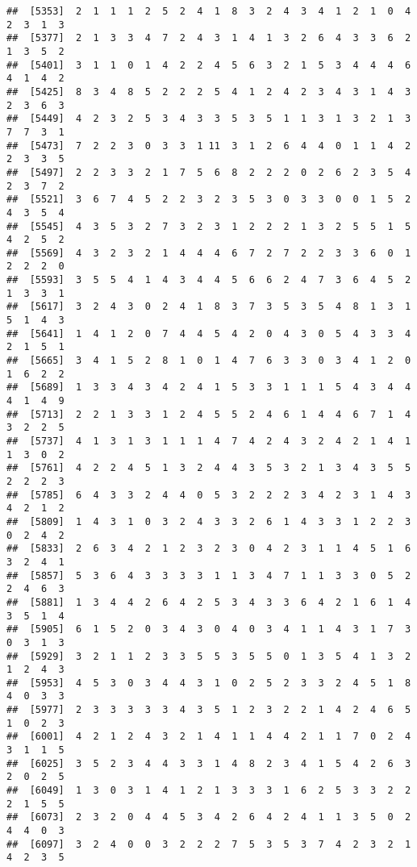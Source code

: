 \documentclass[
]{article}
\begin{document}
\begin{verbatim}
##  [5353]  2  1  1  1  2  5  2  4  1  8  3  2  4  3  4  1  2  1  0  4  2  3  1  3
##  [5377]  2  1  3  3  4  7  2  4  3  1  4  1  3  2  6  4  3  3  6  2  1  3  5  2
##  [5401]  3  1  1  0  1  4  2  2  4  5  6  3  2  1  5  3  4  4  4  6  4  1  4  2
##  [5425]  8  3  4  8  5  2  2  2  5  4  1  2  4  2  3  4  3  1  4  3  2  3  6  3
##  [5449]  4  2  3  2  5  3  4  3  3  5  3  5  1  1  3  1  3  2  1  3  7  7  3  1
##  [5473]  7  2  2  3  0  3  3  1 11  3  1  2  6  4  4  0  1  1  4  2  2  3  3  5
##  [5497]  2  2  3  3  2  1  7  5  6  8  2  2  2  0  2  6  2  3  5  4  2  3  7  2
##  [5521]  3  6  7  4  5  2  2  3  2  3  5  3  0  3  3  0  0  1  5  2  4  3  5  4
##  [5545]  4  3  5  3  2  7  3  2  3  1  2  2  2  1  3  2  5  5  1  5  4  2  5  2
##  [5569]  4  3  2  3  2  1  4  4  4  6  7  2  7  2  2  3  3  6  0  1  2  2  2  0
##  [5593]  3  5  5  4  1  4  3  4  4  5  6  6  2  4  7  3  6  4  5  2  1  3  3  1
##  [5617]  3  2  4  3  0  2  4  1  8  3  7  3  5  3  5  4  8  1  3  1  5  1  4  3
##  [5641]  1  4  1  2  0  7  4  4  5  4  2  0  4  3  0  5  4  3  3  4  2  1  5  1
##  [5665]  3  4  1  5  2  8  1  0  1  4  7  6  3  3  0  3  4  1  2  0  1  6  2  2
##  [5689]  1  3  3  4  3  4  2  4  1  5  3  3  1  1  1  5  4  3  4  4  4  1  4  9
##  [5713]  2  2  1  3  3  1  2  4  5  5  2  4  6  1  4  4  6  7  1  4  3  2  2  5
##  [5737]  4  1  3  1  3  1  1  1  4  7  4  2  4  3  2  4  2  1  4  1  1  3  0  2
##  [5761]  4  2  2  4  5  1  3  2  4  4  3  5  3  2  1  3  4  3  5  5  2  2  2  3
##  [5785]  6  4  3  3  2  4  4  0  5  3  2  2  2  3  4  2  3  1  4  3  4  2  1  2
##  [5809]  1  4  3  1  0  3  2  4  3  3  2  6  1  4  3  3  1  2  2  3  0  2  4  2
##  [5833]  2  6  3  4  2  1  2  3  2  3  0  4  2  3  1  1  4  5  1  6  3  2  4  1
##  [5857]  5  3  6  4  3  3  3  3  1  1  3  4  7  1  1  3  3  0  5  2  2  4  6  3
##  [5881]  1  3  4  4  2  6  4  2  5  3  4  3  3  6  4  2  1  6  1  4  3  5  1  4
##  [5905]  6  1  5  2  0  3  4  3  0  4  0  3  4  1  1  4  3  1  7  3  0  3  1  3
##  [5929]  3  2  1  1  2  3  3  5  5  3  5  5  0  1  3  5  4  1  3  2  1  2  4  3
##  [5953]  4  5  3  0  3  4  4  3  1  0  2  5  2  3  3  2  4  5  1  8  4  0  3  3
##  [5977]  2  3  3  3  3  3  4  3  5  1  2  3  2  2  1  4  2  4  6  5  1  0  2  3
##  [6001]  4  2  1  2  4  3  2  1  4  1  1  4  4  2  1  1  7  0  2  4  3  1  1  5
##  [6025]  3  5  2  3  4  4  3  3  1  4  8  2  3  4  1  5  4  2  6  3  2  0  2  5
##  [6049]  1  3  0  3  1  4  1  2  1  3  3  3  1  6  2  5  3  3  2  2  2  1  5  5
##  [6073]  2  3  2  0  4  4  5  3  4  2  6  4  2  4  1  1  3  5  0  2  4  4  0  3
##  [6097]  3  2  4  0  0  3  2  2  2  7  5  3  5  3  7  4  2  3  2  1  4  2  3  5

\end{verbatim}
\end{document}
